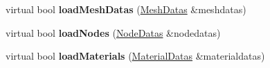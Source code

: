 \begin{DoxyCompactItemize}
\item 
\mbox{\label{classBundle3D_a471bfbfba8795c0b5d27bedc1a73b0d6}} 
virtual bool {\bfseries load\+Mesh\+Datas} (\hyperlink{structMeshDatas}{Mesh\+Datas} \&meshdatas)
\item 
\mbox{\label{classBundle3D_af7a59917d5d025dc2912a16231c25c06}} 
virtual bool {\bfseries load\+Nodes} (\hyperlink{structNodeDatas}{Node\+Datas} \&nodedatas)
\item 
\mbox{\label{classBundle3D_a15c7a2e25b8b78b4a50c2410ade1923d}} 
virtual bool {\bfseries load\+Materials} (\hyperlink{structMaterialDatas}{Material\+Datas} \&materialdatas)
\end{DoxyCompactItemize}
